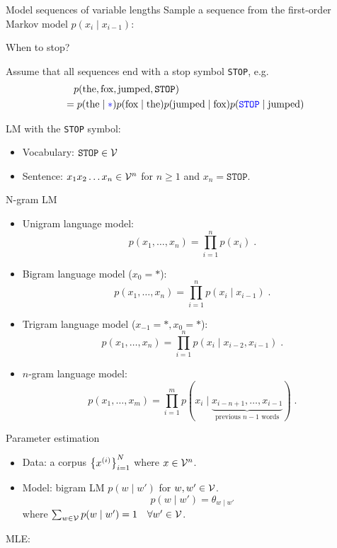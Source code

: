 \documentclass[usenames,dvipsnames,notes]{beamer}
\begin{document}
\begin{frame}
    {Model sequences of variable lengths}
    Sample a sequence from the first-order Markov model $p(x_i\mid x_{i-1})$:\\
    \vspace{3em}

    When to stop?

    \pause
    Assume that all sequences end with a stop symbol \texttt{STOP}, e.g.
    \begin{align*}
        &\quad p(\text{the}, \text{fox}, \text{jumped}, \texttt{STOP})\\
         &= p(\text{the}\mid {\color{blue}*})
         p(\text{fox}\mid \text{the})
         p(\text{jumped}\mid \text{fox})
         p({\color{blue}\texttt{STOP}}\mid \text{jumped})
    \end{align*}

    LM with the \texttt{STOP} symbol:\\
    \begin{itemize}
        \item Vocabulary: $\texttt{STOP} \in \mathcal{V}$
        \item Sentence: $x_1 x_2 \ldots x_n \in \mathcal{V}^n$ for $n\ge 1$ and $x_n=\texttt{STOP}$.
    \end{itemize}
\end{frame}

\begin{frame}
    {N-gram LM}
    \begin{itemize}
        \item Unigram language model:
            $$
            p(x_1,\ldots, x_n) = \prod_{i=1}^n p(x_i) \;.
            $$
        \item Bigram language model ($x_0=*$):
            $$
            p(x_1,\ldots, x_n) = \prod_{i=1}^n p(x_i\mid x_{i-1}) \;.
            $$
        \item Trigram language model ($x_{-1}=*,x_0=*$):
            $$
            p(x_1,\ldots, x_n) = \prod_{i=1}^n p(x_i\mid x_{i-2}, x_{i-1}) \;.
            $$
        \item $n$-gram language model:
            $$
            p(x_1,\ldots, x_m) = \prod_{i=1}^m p(x_i\mid \underbrace{
                x_{i-n+1},\ldots, x_{i-1}
            }_{\text{previous $n-1$ words}} )
            \;.
            $$
    \end{itemize}
\end{frame}

\begin{frame}
    {Parameter estimation}
    \begin{itemize}
        \itemsep1em
        \item Data: a corpus $\left\{ x^{(i)} \right\}_{i=1}^N$ where $x\in\mathcal{V}^n$.
        \item Model: bigram LM $p(w\mid w')$ for $w,w'\in\mathcal{V}$.
            $$
            p(w\mid w') = \theta_{w\mid w'}
            $$
            where $\sum_{w\in\mathcal{V}}p(w\mid w') = 1 \quad \forall w'\in\mathcal{V}$.
    \end{itemize}

    MLE:
    \vspace{5em}
\end{frame}
\end{document}

